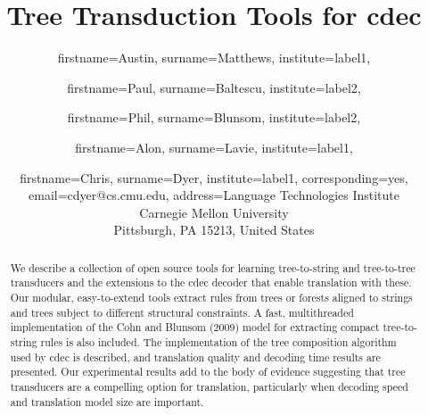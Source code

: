 \documentclass[nofonts]{pbml} %
\begin{document}
\title{Tree Transduction Tools for cdec}


\author{
  firstname=Austin,
  surname=Matthews,
  institute=label1,
}
\author{
  firstname=Paul,
  surname=Baltescu,
  institute=label2,
}
\author{
  firstname=Phil,
  surname=Blunsom,
  institute=label2,
}
\author{
  firstname=Alon,
  surname=Lavie,
  institute=label1,
}
\author{
  firstname=Chris,
  surname=Dyer,
  institute=label1,
  corresponding=yes,
  email={cdyer@cs.cmu.edu},
  address={Language Technologies Institute\\Carnegie Mellon University\\Pittsburgh, PA 15213, United States}
}

\PBMLmaketitle

\begin{abstract}
We describe a collection of open source tools for learning
tree-to-string and tree-to-tree transducers and the extensions to the
cdec decoder that enable translation with these. Our modular,
easy-to-extend tools extract rules from trees or forests aligned to
strings and trees subject to different structural constraints. A fast,
multithreaded implementation of the Cohn and Blunsom (2009) model for
extracting compact tree-to-string rules is also included. The
implementation of the tree composition algorithm used by cdec is
described, and translation quality and decoding time results are
presented. Our experimental results add to the body of evidence suggesting that
tree transducers are a compelling option for translation, particularly
when decoding speed and translation model size are important.
\end{abstract}
\end{document}
